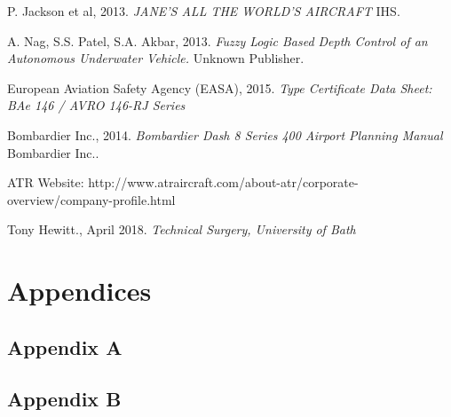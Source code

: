 \documentclass[11pt]{article}
\begin{document}
\begin{thebibliography}{9}
P. Jackson et al, 2013.
\textit{JANE'S ALL THE WORLD'S AIRCRAFT}
IHS. 

A. Nag, S.S. Patel, S.A. Akbar, 2013.
\textit{Fuzzy Logic Based Depth Control of an Autonomous Underwater Vehicle.}
Unknown Publisher. 

European Aviation Safety Agency (EASA), 2015.
\textit{Type Certificate Data Sheet: BAe 146 / AVRO 146-RJ Series}

Bombardier Inc., 2014.
\textit{Bombardier Dash 8 Series 400 Airport Planning Manual}
Bombardier Inc..

ATR Website: http://www.atraircraft.com/about-atr/corporate-overview/company-profile.html

Tony Hewitt., April 2018.
\textit{Technical Surgery, University of Bath}


\end{thebibliography}

\pagebreak
\section*{Appendices}
\subsection*{Appendix A}
\newpage
\subsection{Appendix B}
\end{document}
